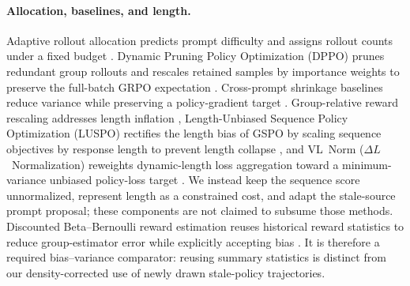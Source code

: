 \documentclass{article}
\begin{document}
\paragraph{Allocation, baselines, and length.}
Adaptive rollout allocation predicts prompt difficulty and assigns rollout
counts under a fixed budget \cite{nguyen2026adaptive}. Dynamic Pruning Policy
Optimization (DPPO) prunes redundant group rollouts and rescales retained
samples by importance weights to preserve the full-batch GRPO expectation
\cite{zhu2026dppo}. Cross-prompt shrinkage
baselines reduce variance while preserving a policy-gradient target
\cite{zeng2026shrinkage}. Group-relative reward rescaling addresses length
inflation \cite{li2026length}, Length-Unbiased Sequence Policy
Optimization (LUSPO) rectifies the length bias of GSPO by scaling sequence
objectives by response length to prevent length collapse \cite{liu2026luspo},
and VL~Norm ($\Delta L$~Normalization) reweights dynamic-length loss aggregation
toward a minimum-variance unbiased policy-loss target \cite{he2025vlnorm}.
We instead keep the sequence score unnormalized, represent length as a
constrained cost, and adapt the stale-source prompt proposal; these components
are not claimed to subsume those methods.
Discounted Beta--Bernoulli reward estimation reuses historical reward
statistics to reduce group-estimator error while explicitly accepting bias
\cite{kim2026dbb}. It is therefore a required bias--variance comparator:
reusing summary statistics is distinct from our density-corrected use of newly
drawn stale-policy trajectories.
\end{document}
